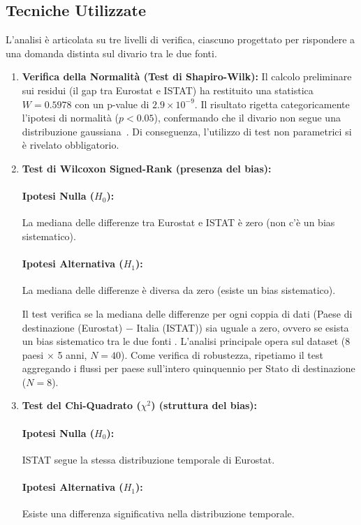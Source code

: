 \subsection{Tecniche Utilizzate}
L'analisi è articolata su tre livelli di verifica, ciascuno progettato per rispondere a una domanda distinta sul divario tra le due fonti.
\begin{enumerate}
    \item \textbf{Verifica della Normalità (Test di Shapiro-Wilk):}
    Il calcolo preliminare sui residui (il gap tra Eurostat e ISTAT)
    ha restituito una statistica $W = 0.5978$ con un p-value di
    $2.9 \times 10^{-9}$.
    Il risultato rigetta categoricamente l'ipotesi di normalità
    ($p < 0.05$), confermando che il divario non segue una distribuzione
    gaussiana~\cite{shapiro_wilk1965}.
    Di conseguenza, l'utilizzo di test non parametrici si è rivelato obbligatorio.

    \item \textbf{Test di Wilcoxon Signed-Rank (presenza del bias):}
    \paragraph{Ipotesi Nulla ($H_0$):} La mediana delle differenze tra Eurostat e ISTAT è zero (non c'è un bias sistematico).
    \paragraph{Ipotesi Alternativa ($H_1$):} La mediana delle differenze è diversa da zero (esiste un bias sistematico).

    Il test verifica se la mediana delle differenze per ogni coppia di dati
    (Paese di destinazione (Eurostat) $-$ Italia (ISTAT)) sia uguale a zero, ovvero se esista un bias
    sistematico tra le due fonti \cite{wilcoxon1945}.
    L'analisi principale opera sul dataset
    (8 paesi $\times$ 5 anni, $N = 40$).
    Come verifica di robustezza, ripetiamo il test aggregando i flussi
    per paese sull'intero quinquennio per Stato di destinazione ($N = 8$).

    \item \textbf{Test del Chi-Quadrato ($\chi^2$) (struttura del bias):}
    \paragraph{Ipotesi Nulla ($H_0$):} ISTAT segue la stessa distribuzione temporale di Eurostat.
    \paragraph{Ipotesi Alternativa ($H_1$):} Esiste una differenza significativa nella distribuzione temporale.


\end{enumerate}
